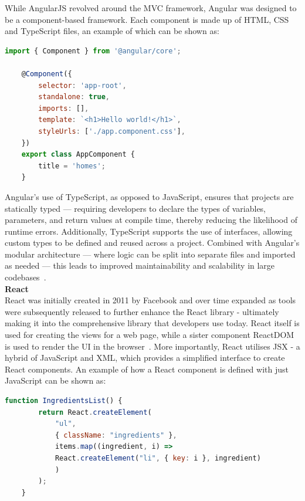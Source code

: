 \documentclass[]{final_report}
\begin{document}
While AngularJS revolved around the MVC framework, Angular was designed to be a component-based framework. Each component is made up of HTML, CSS and TypeScript files, an example of which can be shown as:

\begin{lstlisting}[language=javascript, caption={An example of a "Hello World" component in Angular\cite{HELLO_ANGULAR}}]
	import { Component } from '@angular/core';
	
	@Component({
		selector: 'app-root',
		standalone: true,
		imports: [],
		template: `<h1>Hello world!</h1>`,
		styleUrls: ['./app.component.css'],
	})
	export class AppComponent {
		title = 'homes';
	}
\end{lstlisting}

Angular's use of TypeScript, as opposed to JavaScript, ensures that projects are statically typed — requiring developers to declare the types of variables, parameters, and return values at compile time, thereby reducing the likelihood of runtime errors. Additionally, TypeScript supports the use of interfaces, allowing custom types to be defined and reused across a project. Combined with Angular’s modular architecture — where logic can be split into separate files and imported as needed — this leads to improved maintainability and scalability in large codebases~\cite{TSvJS}.\\

\textbf{React}\\
React was initially created in 2011 by Facebook and over time expanded as tools were subsequently released to further enhance the React library - ultimately making it into the comprehensive library that developers use today. React itself is used for creating the views for a web page, while a sister component ReactDOM is used to render the UI in the browser~\cite{BANKS_REACT}. More importantly, React utilises JSX - a hybrid of JavaScript and XML, which provides a simplified interface to create React components. An example of how a React component is defined with just JavaScript can be shown as:

\begin{lstlisting}[language=javascript, caption={An example of a React element being defined with JavaScript\cite{BANKS_REACT}}]
	function IngredientsList() {
		return React.createElement(
			"ul",
			{ className: "ingredients" },
			items.map((ingredient, i) =>
			React.createElement("li", { key: i }, ingredient)
			)
		);
	}
\end{lstlisting}
\end{document}
